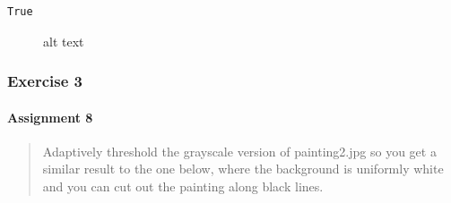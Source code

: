 \documentclass[11pt]{article}
\makeatletter
\newcommand{\boxspacing}{\kern\kvtcb@left@rule\kern\kvtcb@boxsep}
\newcommand{\prompt}[4]{
        {\ttfamily\llap{{\color{#2}[#3]:\hspace{3pt}#4}}\vspace{-\baselineskip}}
    }
\makeatother
\begin{document}
            \begin{tcolorbox}[breakable, size=fbox, boxrule=.5pt, pad at break*=1mm, opacityfill=0]
\prompt{Out}{outcolor}{9}{\boxspacing}
\begin{Verbatim}[commandchars=\\\{\}]
True
\end{Verbatim}
\end{tcolorbox}
        
    \begin{figure}
\centering
{}
\caption{alt text}
\end{figure}

    \subsubsection{Exercise 3}\label{exercise-3}

\paragraph{Assignment 8}\label{assignment-8}

\begin{quote}
Adaptively threshold the grayscale version of painting2.jpg so you get a
similar result to the one below, where the background is uniformly white
and you can cut out the painting along black lines.
\end{quote}
\end{document}

